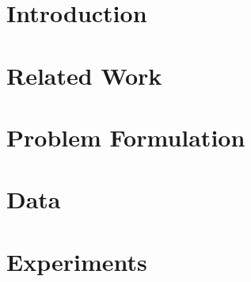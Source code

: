 \documentclass[MTech]{iitmdiss}
\begin{document}

\begin{singlespace}
\tableofcontents
\thispagestyle{empty}

\listoftables
{}
\listoffigures
{}
\end{singlespace}

\pagebreak


%
%
%
\chapter{Introduction}


\chapter{Related Work}


\chapter{Problem Formulation}



\chapter{Data}


\chapter{Experiments}

\end{document}

